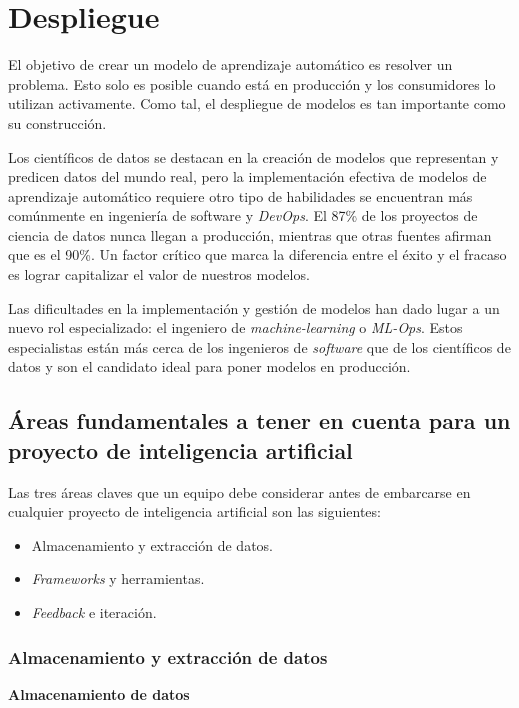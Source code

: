 \documentclass[a4paper,12pt]{article}
\begin{document}
		\clearpage
						
		\section{Despliegue} \label{ModelDeployment}
		El objetivo de crear un modelo de aprendizaje automático es resolver un problema. Esto solo es posible cuando está en producción y los consumidores lo utilizan activamente. Como tal, el despliegue de modelos es tan importante como su construcción.
						
		Los científicos de datos se destacan en la creación de modelos que representan y predicen datos del mundo real, pero la implementación efectiva de modelos de aprendizaje automático requiere otro tipo de habilidades se encuentran más comúnmente en ingeniería de software y \textit{DevOps}. El 87\% de los proyectos de ciencia de datos nunca llegan a producción, mientras que otras fuentes afirman que es el 90\%. \citep{RisingOdegua} Un factor crítico que marca la diferencia entre el éxito y el fracaso es lograr capitalizar el valor de nuestros modelos.
				
		Las dificultades en la implementación y gestión de modelos han dado lugar a un nuevo rol especializado: el ingeniero de \textit{machine-learning} o \textit{ML-Ops}. Estos especialistas están más cerca de los ingenieros de \textit{software} que de los científicos de datos y son el candidato ideal para poner modelos en producción.
				
		\subsection{Áreas fundamentales a tener en cuenta para un proyecto de inteligencia artificial} \label{section:criticalareasai}
				
		Las tres áreas claves que un equipo debe considerar antes de embarcarse en cualquier proyecto de inteligencia artificial son las siguientes:
		\begin{itemize}[noitemsep, topsep=2pt]
			\item Almacenamiento y extracción de datos.
			\item \textit{Frameworks} y herramientas.
			\item \textit{Feedback} e iteración.
		\end{itemize}
				
		\subsubsection{Almacenamiento y extracción de datos}
		\textbf{Almacenamiento de datos}
				
\end{document}
